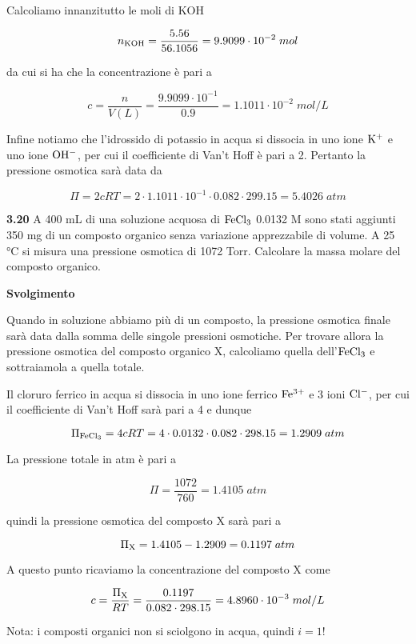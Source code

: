 \vspace{0.2cm}Calcoliamo innanzitutto le moli di KOH

$$n_{\rm KOH}=\frac{5.56}{56.1056}=9.9099 \cdot 10^{-2}\;mol$$

da cui si ha che la concentrazione è pari a

$$c=\frac{n}{V(L)}=\frac{9.9099 \cdot 10^{-1}}{0.9}=1.1011 \cdot 10^{-2}\;mol/L$$

Infine notiamo che l'idrossido di potassio in acqua si dissocia in uno ione $\rm K^+$ e uno ione $\rm OH^-$, per cui il coefficiente di Van't Hoff è pari a 2. Pertanto la pressione osmotica sarà data da

$$\Pi=2cRT
=2 \cdot 1.1011 \cdot 10^{-1} \cdot 0.082 \cdot 299.15
=5.4026\;atm$$

\vspace{0.2cm}\textbf{3.20} A 400 mL di una soluzione acquosa di $\rm FeCl_3$ 0.0132 M sono stati aggiunti 350 mg di un composto organico senza variazione apprezzabile di volume. A 25 °C si misura una pressione osmotica di 1072 Torr. Calcolare la massa molare del composto organico.

\vspace{0.2cm}\large\textbf{Svolgimento}\normalsize

\vspace{0.2cm}Quando in soluzione abbiamo più di un composto, la pressione osmotica finale sarà data dalla somma delle singole pressioni osmotiche. Per trovare allora la pressione osmotica del composto organico X, calcoliamo quella dell'$\rm FeCl_3$ e sottraiamola a quella totale.

Il cloruro ferrico in acqua si dissocia in uno ione ferrico $\rm Fe^{3+}$ e 3 ioni $\rm Cl^-$, per cui il coefficiente di Van't Hoff sarà pari a 4 e dunque

$$\Pi_{\rm FeCl_3}=4cRT
=4 \cdot 0.0132 \cdot 0.082 \cdot 298.15
=1.2909\;atm$$

La pressione totale in atm è pari a

$$\Pi=\frac{1072}{760}=1.4105\;atm$$

quindi la pressione osmotica del composto X sarà pari a

$$\Pi_{\rm X}=1.4105 - 1.2909 = 0.1197\;atm$$

A questo punto ricaviamo la concentrazione del composto X come

$$c=\frac{\Pi_{\rm X}}{RT}=\frac{0.1197}{0.082 \cdot 298.15}
=4.8960 \cdot 10^{-3}\;mol/L$$

Nota: i composti organici non si sciolgono in acqua, quindi $i=1$!

